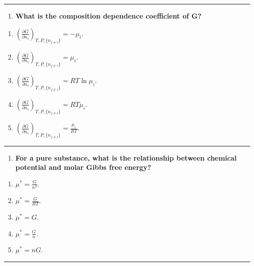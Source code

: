 \documentclass[
  9pt,
]{extbook}
\providecommand{\tightlist}{%
  \setlength{\itemsep}{0pt}\setlength{\parskip}{0pt}}
\theoremstyle{definition}
\theoremstyle{definition}
\theoremstyle{definition}
\theoremstyle{remark}
\begin{document}
\begin{center}\rule{0.5\linewidth}{0.5pt}\end{center}

\begin{enumerate}
\def\labelenumi{\arabic{enumi}.}
\setcounter{enumi}{6}
\tightlist
\item
  \textbf{What is the composition dependence coefficient of G?}
\end{enumerate}

\begin{enumerate}
\def\labelenumi{\alph{enumi}.}
\tightlist
\item
  \(\left(\frac{\partial G}{\partial n_i}\right)_{T,P,\{n_{j\neq i}\}} = -\mu_i\).
\item
  \(\left(\frac{\partial G}{\partial n_i}\right)_{T,P,\{n_{j\neq i}\}} = \mu_i\).
\item
  \(\left(\frac{\partial G}{\partial n_i}\right)_{T,P,\{n_{j\neq i}\}} = RT\ln\mu_i\).
\item
  \(\left(\frac{\partial G}{\partial n_i}\right)_{T,P,\{n_{j\neq i}\}} = RT\mu_i\).
\item
  \(\left(\frac{\partial G}{\partial n_i}\right)_{T,P,\{n_{j\neq i}\}} = \frac{\mu_i}{RT}\).
\end{enumerate}

\begin{center}\rule{0.5\linewidth}{0.5pt}\end{center}

\begin{enumerate}
\def\labelenumi{\arabic{enumi}.}
\setcounter{enumi}{7}
\tightlist
\item
  \textbf{For a pure substance, what is the relationship between chemical potential and molar Gibbs free energy?}
\end{enumerate}

\begin{enumerate}
\def\labelenumi{\alph{enumi}.}
\tightlist
\item
  \(\mu^* = \frac{G}{n^2}\).
\item
  \(\mu^* = \frac{G}{RT}\).
\item
  \(\mu^* = G\).
\item
  \(\mu^* = \frac{G}{n}\).
\item
  \(\mu^* = nG\).
\end{enumerate}

\begin{center}\rule{0.5\linewidth}{0.5pt}\end{center}
\end{document}

